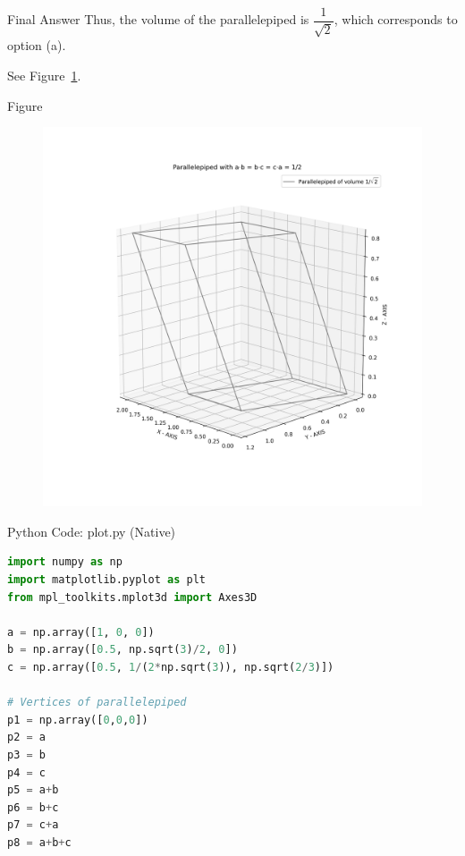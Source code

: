 \documentclass{beamer}
\begin{document}
\begin{frame}{Final Answer}
Thus, the volume of the parallelepiped is $\dfrac{1}{\sqrt{2}}$, which corresponds to option (a).

See Figure~\ref{fig:3DVectors}.  
\end{frame}

\begin{frame}{Figure}
    \begin{figure}[h!]
    \centering
    \includegraphics[width=0.7\linewidth]{figs/fig.png}
    \caption{}
    \label{fig:3DVectors}
\end{figure}
\end{frame}

\begin{frame}[fragile]{Python Code: plot.py (Native)}
\begin{lstlisting}[language=Python]
import numpy as np
import matplotlib.pyplot as plt
from mpl_toolkits.mplot3d import Axes3D

a = np.array([1, 0, 0])
b = np.array([0.5, np.sqrt(3)/2, 0])
c = np.array([0.5, 1/(2*np.sqrt(3)), np.sqrt(2/3)])

# Vertices of parallelepiped
p1 = np.array([0,0,0])
p2 = a
p3 = b
p4 = c
p5 = a+b
p6 = b+c
p7 = c+a
p8 = a+b+c
\end{lstlisting}
\end{frame}
\end{document}
